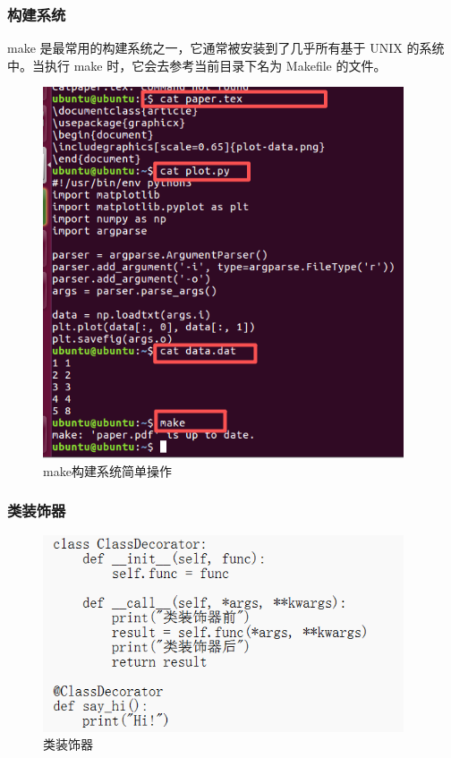 \documentclass[UTF8]{ctexart}
\begin{document}
\subsubsection{构建系统}
make 是最常用的构建系统之一，它通常被安装到了几乎所有基于 UNIX 的系统中。当执行 make 时，它会去参考当前目录下名为 Makefile 的文件。
\begin{figure}[H]
    \centering
    \includegraphics[width=0.95\textwidth]{picture/make.png}%
    \caption{make构建系统简单操作}
\end{figure}

\subsubsection{类装饰器}

\begin{figure}[H]
    \centering
    \includegraphics[width=0.95\textwidth]{picture/类装饰器的创建.png}%
    \caption{类装饰器}
\end{figure}
\end{document}
